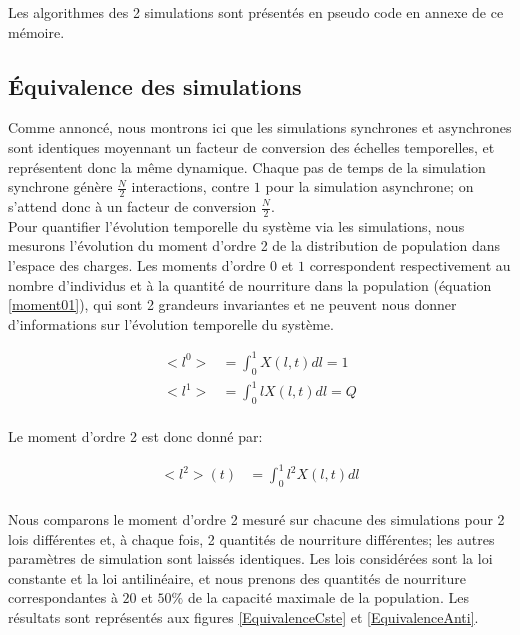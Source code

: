 Les algorithmes des 2 simulations sont présentés en pseudo code en annexe de ce mémoire.


\subsection{Équivalence des simulations}

Comme annoncé, nous montrons ici que les simulations synchrones et asynchrones sont identiques moyennant un facteur de conversion des échelles temporelles, et représentent donc la même dynamique. Chaque pas de temps de la simulation synchrone génère $\frac{N}{2}$ interactions, contre $1$ pour la simulation asynchrone; on s'attend donc à un facteur de conversion $\frac{N}{2}$.\\

Pour quantifier l'évolution temporelle du système via les simulations, nous mesurons l'évolution du moment d'ordre 2 de la distribution de population dans l'espace des charges. Les moments d'ordre $0$ et $1$ correspondent respectivement au nombre d'individus et à la quantité de nourriture dans la population (équation \ref{moment01}), qui sont 2 grandeurs invariantes et ne peuvent nous donner d'informations sur l'évolution temporelle du système.

\begin{equation}
\begin{aligned}
<l^0> &= \int_0^1 X(l,t) dl = 1\\
<l^1> &= \int_0^1 l X(l,t) dl = Q\\
\end{aligned}
\label{moment01}
\end{equation}

Le moment d'ordre 2 est donc donné par:

\begin{equation}
\begin{aligned}
<l^2>(t) &= \int_0^1 l^2 X(l,t) dl \\
\end{aligned}
\label{moment2continu}
\end{equation}


Nous comparons le moment d'ordre 2 mesuré sur chacune des simulations pour 2 lois différentes et, à chaque fois, 2 quantités de nourriture différentes; les autres paramètres de simulation sont laissés identiques. Les lois considérées sont la loi constante et la loi antilinéaire, et nous prenons des quantités de nourriture correspondantes à $20$ et $50\%$ de la capacité maximale de la population. Les résultats sont représentés aux figures \ref{EquivalenceCste} et \ref{EquivalenceAnti}.


